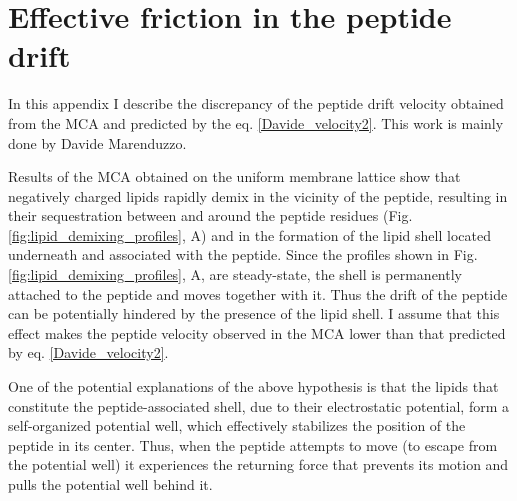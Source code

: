 \chapter{Effective friction in the peptide drift}

\label{effective_friction}

In this appendix I describe the discrepancy of the peptide drift velocity obtained from the MCA and predicted by the eq. \eqref{Davide_velocity2}. This work is mainly done by Davide Marenduzzo.

Results of the MCA obtained on the uniform membrane lattice show that negatively charged lipids rapidly demix in the vicinity of the peptide, resulting in their sequestration between and around the peptide residues (Fig. \ref{fig:lipid_demixing_profiles}, A) and in the formation of the lipid shell located underneath and associated with the peptide. Since the profiles shown in Fig. \ref{fig:lipid_demixing_profiles}, A, are steady-state, the shell is permanently attached to the peptide and moves together with it. Thus the drift of the peptide can be potentially hindered by the presence of the lipid shell. I assume that this effect makes the peptide velocity observed in the MCA lower than that predicted by eq. \eqref{Davide_velocity2}.

One of the potential explanations of the above hypothesis is that the lipids that constitute the peptide-associated shell, due to their electrostatic potential, form a self-organized potential well, which effectively stabilizes the position of the peptide in its center. Thus, when the peptide attempts to move (to escape from the potential well) it experiences the returning force that prevents its motion and pulls the potential well behind it.

